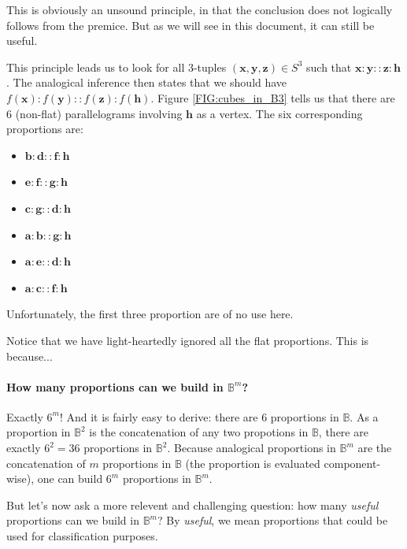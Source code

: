 This is obviously an unsound principle, in that the conclusion does not
logically follows from the premice. But as we will see in this document, it can
still be useful.

This principle leads us to look for all 3-tuples $(\mathbf{x}, \mathbf{y},
\mathbf{z}) \in S^3$ such that $\mathbf{x}:\mathbf{y}::\mathbf{z}:\mathbf{h}$.
The analogical inference then states that we should have
$f(\mathbf{x}):f(\mathbf{y})::f(\mathbf{z}):f(\mathbf{h})$. Figure
\ref{FIG:cubes_in_B3} tells us that there are 6 (non-flat) parallelograms
involving $\mathbf{h}$ as a vertex. The six corresponding proportions are:

\begin{itemize}
  \item $\mathbf{b} : \mathbf{d} :: \mathbf{f} : \mathbf{h}$
  \item $\mathbf{e} : \mathbf{f} :: \mathbf{g} : \mathbf{h}$
  \item $\mathbf{c} : \mathbf{g} :: \mathbf{d} : \mathbf{h}$
  \item $\mathbf{a} : \mathbf{b} :: \mathbf{g} : \mathbf{h}$
  \item $\mathbf{a} : \mathbf{e} :: \mathbf{d} : \mathbf{h}$
  \item $\mathbf{a} : \mathbf{c} :: \mathbf{f} : \mathbf{h}$
\end{itemize}

Unfortunately, the first three proportion are of no use here. 

Notice that we have light-heartedly ignored  all the flat proportions. This is
because...

\paragraph{How many proportions can we build in $\mathbb{B}^m$?\\}

Exactly $6^m$! And it is fairly easy to derive: there are $6$ proportions in
$\mathbb{B}$. As a proportion in $\mathbb{B}^2$ is the concatenation of any
two propotions in $\mathbb{B}$, there are exactly $6^2 = 36$ proportions in
$\mathbb{B}^2$. Because analogical proportions in $\mathbb{B}^m$ are the
concatenation of $m$ proportions in $\mathbb{B}$ (the proportion is evaluated
component-wise), one can build $6^m$ proportions in $\mathbb{B}^m$.

But let's now ask a more relevent and challenging question: how many
\textit{useful} proportions can we build in $\mathbb{B}^m$? By \textit{useful},
we mean proportions that could be used for classification purposes.

